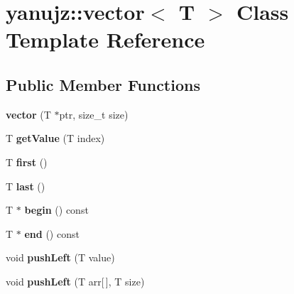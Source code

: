 \hypertarget{classyanujz_1_1vector}{}\section{yanujz\+:\+:vector$<$ T $>$ Class Template Reference}
\label{classyanujz_1_1vector}
\subsection*{Public Member Functions}
\begin{DoxyCompactItemize}
\item 
\mbox{\label{classyanujz_1_1vector_afc2995df62370c8bffab0952d82e69d1}} 
{\bfseries vector} (T $\ast$ptr, size\+\_\+t size)
\item 
\mbox{\label{classyanujz_1_1vector_a4f73ceed1f2fab819718827b77240b31}} 
T {\bfseries get\+Value} (T index)
\item 
\mbox{\label{classyanujz_1_1vector_aaecd4b3fb974c266c26cc1ff56b4f9b7}} 
T {\bfseries first} ()
\item 
\mbox{\label{classyanujz_1_1vector_ab87af80e5f0ab58ae0a980f9a71535bc}} 
T {\bfseries last} ()
\item 
\mbox{\label{classyanujz_1_1vector_a8e03dc943257d9aa5d8575458706d7ab}} 
T $\ast$ {\bfseries begin} () const
\item 
\mbox{\label{classyanujz_1_1vector_ac3ae405b734f1b27dac9262f57858fe6}} 
T $\ast$ {\bfseries end} () const
\item 
\mbox{\label{classyanujz_1_1vector_a8ae16eebf17e251f68741c3bdb6194dc}} 
void {\bfseries push\+Left} (T value)
\item 
\mbox{\label{classyanujz_1_1vector_adeb4def36589813d937b60a66bbcfc12}} 
void {\bfseries push\+Left} (T arr\mbox{[}$\,$\mbox{]}, T size)
\item 
\mbox{\label{classyanujz_1_1vector_af12781ddff0fc729f68278f76822e25e}} 

\end{DoxyCompactItemize}
